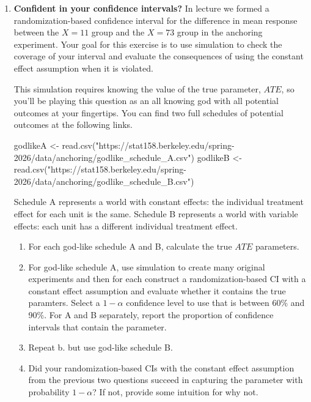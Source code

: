 \documentclass[
  letterpaper,
  DIV=11,
  numbers=noendperiod]{scrartcl}
\newenvironment{Shaded}{\begin{snugshade}}{\end{snugshade}}
\newcommand{\FunctionTok}[1]{\textcolor[rgb]{0.28,0.35,0.67}{#1}}
\newcommand{\NormalTok}[1]{\textcolor[rgb]{0.00,0.23,0.31}{#1}}
\newcommand{\OtherTok}[1]{\textcolor[rgb]{0.00,0.23,0.31}{#1}}
\newcommand{\StringTok}[1]{\textcolor[rgb]{0.13,0.47,0.30}{#1}}
\providecommand{\tightlist}{%
  \setlength{\itemsep}{0pt}\setlength{\parskip}{0pt}}
\begin{document}
\begin{enumerate}
\def\labelenumi{\arabic{enumi}.}
\setcounter{enumi}{1}
\item
  \textbf{Confident in your confidence intervals?} In lecture we formed
  a randomization-based confidence interval for the difference in mean
  response between the \(X=11\) group and the \(X=73\) group in the
  anchoring experiment. Your goal for this exercise is to use simulation
  to check the coverage of your interval and evaluate the consequences
  of using the constant effect assumption when it is violated.

  This simulation requires knowing the value of the true parameter,
  \(ATE\), so you'll be playing this question as an all knowing god with
  all potential outcomes at your fingertips. You can find two full
  schedules of potential outcomes at the following links.

\begin{Shaded}
\begin{Highlighting}[]
\NormalTok{godlikeA }\OtherTok{\textless{}{-}} \FunctionTok{read.csv}\NormalTok{(}\StringTok{"https://stat158.berkeley.edu/spring{-}2026/data/anchoring/godlike\_schedule\_A.csv"}\NormalTok{)}
\NormalTok{godlikeB }\OtherTok{\textless{}{-}} \FunctionTok{read.csv}\NormalTok{(}\StringTok{"https://stat158.berkeley.edu/spring{-}2026/data/anchoring/godlike\_schedule\_B.csv"}\NormalTok{)}
\end{Highlighting}
\end{Shaded}

  Schedule A represents a world with constant effects: the individual
  treatment effect for each unit is the same. Schedule B represents a
  world with variable effects: each unit has a different individual
  treatment effect.

  \begin{enumerate}
  \def\labelenumii{\alph{enumii}.}
  \tightlist
  \item
    For each god-like schedule A and B, calculate the true \(ATE\)
    parameters.
  \item
    For god-like schedule A, use simulation to create many original
    experiments and then for each construct a randomization-based CI
    with a constant effect assumption and evaluate whether it contains
    the true paramters. Select a \(1-\alpha\) confidence level to use
    that is between 60\% and 90\%. For A and B separately, report the
    proportion of confidence intervals that contain the parameter.
  \item
    Repeat b. but use god-like schedule B.
  \item
    Did your randomization-based CIs with the constant effect assumption
    from the previous two questions succeed in capturing the parameter
    with probability \(1-\alpha\)? If not, provide some intuition for
    why not.
  \end{enumerate}


\end{enumerate}
\end{document}
